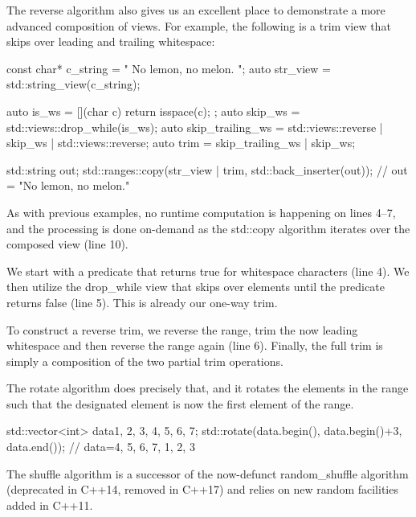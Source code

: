 The reverse algorithm also gives us an excellent place to demonstrate a more advanced composition of views. For example, the following is a trim view that skips over leading and trailing whitespace:

\begin{box-note}
\begin{cppcode}
const char* c_string = "  No lemon, no melon.     ";
auto str_view = std::string_view(c_string);

auto is_ws = [](char c) { return isspace(c); };
auto skip_ws = std::views::drop_while(is_ws);
auto skip_trailing_ws = std::views::reverse | skip_ws | std::views::reverse;
auto trim = skip_trailing_ws | skip_ws;

std::string out;
std::ranges::copy(str_view | trim, std::back_inserter(out));
// out = "No lemon, no melon."
\end{cppcode}
\end{box-note}

As with previous examples, no runtime computation is happening on lines 4–7, and the processing is done on-demand as the std::copy algorithm iterates over the composed view (line 10).

We start with a predicate that returns true for whitespace characters (line 4). We then utilize the drop\_while view that skips over elements until the predicate returns false (line 5). This is already our one-way trim.

To construct a reverse trim, we reverse the range, trim the now leading whitespace and then reverse the range again (line 6). Finally, the full trim is simply a composition of the two partial trim operations.

The rotate algorithm does precisely that, and it rotates the elements in the range such that the designated element is now the first element of the range.



\begin{box-note}
\begin{cppcode}
std::vector<int> data{1, 2, 3, 4, 5, 6, 7};
std::rotate(data.begin(), data.begin()+3, data.end());
// data=4, 5, 6, 7, 1, 2, 3
\end{cppcode}
\end{box-note}

The shuffle algorithm is a successor of the now-defunct random\_shuffle algorithm (deprecated in C++14, removed in C++17) and relies on new random facilities added in C++11.

